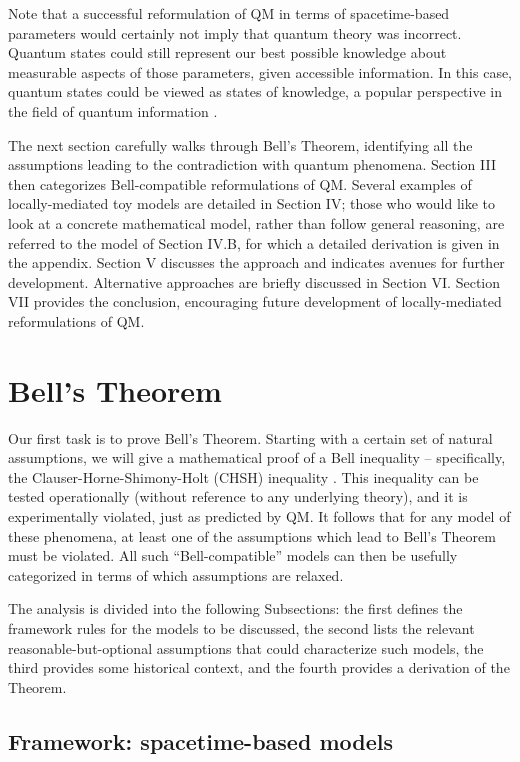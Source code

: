 \documentclass[rmp, aps, preprint, longbibliography]{revtex4-1}
\begin{document}
Note that a successful reformulation of QM in terms of spacetime-based parameters would certainly not imply that quantum theory was incorrect.  Quantum states could still represent our best possible knowledge about measurable aspects of those parameters, given accessible information.  In this case, quantum states could be viewed as states of knowledge, a popular perspective in the field of quantum information \cite{caves2002,spekkens2007,leifer2013}.

The next section carefully walks through Bell's Theorem, identifying all the assumptions leading to the contradiction with quantum phenomena.  Section III then categorizes Bell-compatible reformulations of QM.  Several examples of locally-mediated toy models are detailed in Section IV; those who would like to look at a concrete mathematical model, rather than follow general reasoning, are referred to the model of Section IV.B, for which a detailed derivation is given in the appendix.  Section V discusses the approach and indicates avenues for further development.  Alternative approaches are briefly discussed in Section VI\@.  Section VII provides the conclusion, encouraging future development of locally-mediated reformulations of QM.


\section{Bell's Theorem}

Our first task is to prove Bell's Theorem.  Starting with a certain set of natural assumptions, we will give a mathematical proof of a Bell inequality -- specifically, the Clauser-Horne-Shimony-Holt (CHSH) inequality \cite{clauser1969}.  This inequality can be tested operationally (without reference to any underlying theory), and it is experimentally violated, just as predicted by QM.  It follows that for any model of these phenomena, at least one of the assumptions which lead to Bell's Theorem must be violated.  All such ``Bell-compatible'' models can then be usefully categorized in terms of which assumptions are relaxed.  

The analysis is divided into the following Subsections: the first defines the framework rules for the models to be discussed, the second lists the relevant reasonable-but-optional assumptions that could characterize such models, the third provides some historical context, and the fourth provides a derivation of the Theorem. 

\subsection{Framework: spacetime-based models}
\label{sec:framework}
\end{document}
